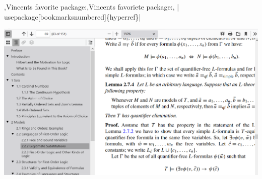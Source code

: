 
\begin{frame}{%
    \lang,Vincents favorite package:,Vincents favoriete package:, \hll|\\usepackage[bookmarksnumbered]\{hyperref\}|}

\includegraphics[height=0.8\textheight,width=\linewidth,keepaspectratio]{assets/hyperref2.png}

\end{frame}

